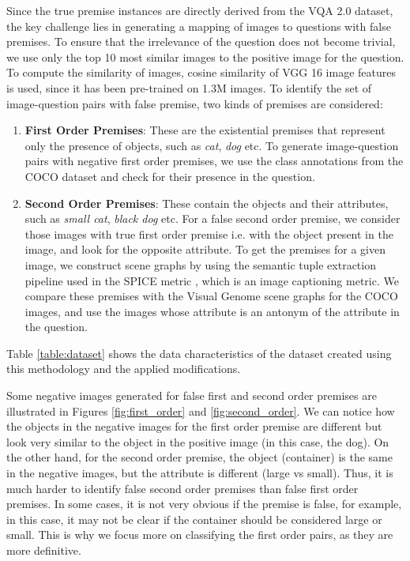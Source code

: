 \noindent
Since the true premise instances are directly derived from the VQA 2.0 dataset, the key challenge lies in generating a mapping of images to questions with false premises. To ensure that the irrelevance of the question does not become trivial, we use only the top 10 most similar images to the positive image for the question. To compute the similarity of images, cosine similarity of VGG 16 image features\cite{SimonyanZ14a} is used, since it has been pre-trained on 1.3M images. To identify the set of image-question pairs with false premise, two kinds of premises are considered:
\begin{enumerate}
\item \textbf{First Order Premises}:
These are the existential premises that represent only the presence of objects, such as \textit{cat}, \textit{dog} etc. To generate image-question pairs with negative first order premises, we use the class annotations from the COCO dataset and check for their presence in the question. 

\item \textbf{Second Order Premises}:
These contain the objects and their attributes, such as \textit{small cat}, \textit{black dog} etc. For a false second order premise, we consider those images with true first order premise i.e. with the object present in the image, and look for the opposite attribute. To get the premises for a given image, we construct scene graphs by using the semantic tuple extraction pipeline used in the SPICE metric \cite{AndersonFJG16}, which is an image captioning metric. We compare these premises with the Visual Genome scene graphs for the COCO images, and use the images whose attribute is an antonym of the attribute in the question.

\end{enumerate}

Table \ref{table:dataset} shows the data characteristics of the dataset created using this methodology and the applied modifications.

Some negative images generated for false first and second order premises are illustrated in Figures \ref{fig:first_order} and \ref{fig:second_order}. We can notice how the objects in the negative images for the first order premise are different but look very similar to the object in the positive image (in this case, the dog). On the other hand, for the second order premise, the object (container) is the same in the negative images, but the attribute is different (large vs small). Thus, it is much harder to identify false second order premises than false first order premises. In some cases, it is not very obvious if the premise is false, for example, in this case, it may not be clear if the container should be considered large or small. This is why we focus more on classifying the first order pairs, as they are more definitive.

